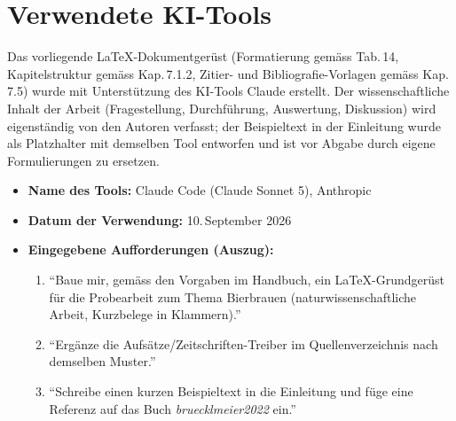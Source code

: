 %

\chapter*{Verwendete KI-Tools}

Das vorliegende LaTeX-Dokumentgerüst (Formatierung gemäss Tab.\,14,
Kapitelstruktur gemäss Kap.\,7.1.2, Zitier- und
Bibliografie-Vorlagen gemäss Kap.\,7.5) wurde mit Unterstützung des
KI-Tools Claude erstellt. Der wissenschaftliche Inhalt der Arbeit
(Fragestellung, Durchführung, Auswertung, Diskussion) wird eigenständig
von den Autoren verfasst; der Beispieltext in der Einleitung wurde als
Platzhalter mit demselben Tool entworfen und ist vor Abgabe durch
eigene Formulierungen zu ersetzen.

\begin{itemize}
  \item \textbf{Name des Tools:} Claude Code (Claude Sonnet 5), Anthropic
  \item \textbf{Datum der Verwendung:} 10.\,September 2026
  \item \textbf{Eingegebene Aufforderungen (Auszug):}
    \begin{enumerate}
      \item[a)] \enquote{Baue mir, gemäss den Vorgaben im Handbuch, ein
        LaTeX-Grundgerüst für die Probearbeit zum Thema Bierbrauen
        (naturwissenschaftliche Arbeit, Kurzbelege in Klammern).}
      \item[b)] \enquote{Ergänze die Aufsätze/Zeitschriften-Treiber im
        Quellenverzeichnis nach demselben Muster.}
      \item[c)] \enquote{Schreibe einen kurzen Beispieltext in die
        Einleitung und füge eine Referenz auf das Buch
        \emph{bruecklmeier2022} ein.}
    \end{enumerate}
\end{itemize}
